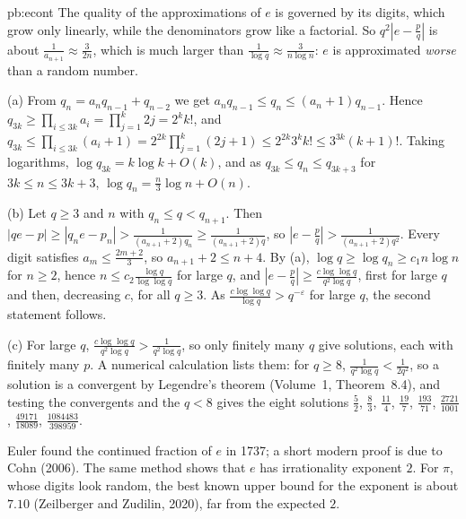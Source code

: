 \begin{solution}{pb:econt}
\idea The quality of the approximations of $e$ is governed by its digits, which grow only linearly, while the denominators grow like a factorial. So
$q^2|e-\frac pq|$ is about $\frac1{a_{n+1}}\approx\frac3{2n}$, which is much larger than $\frac1{\log q}\approx\frac3{n\log n}$: $e$ is approximated \emph{worse}
than a random number.

\writeup (a) From $q_n=a_nq_{n-1}+q_{n-2}$ we get $a_nq_{n-1}\le q_n\le(a_n+1)q_{n-1}$. Hence $q_{3k}\ge\prod_{i\le3k}a_i=\prod_{j=1}^k2j=2^kk!$, and
$q_{3k}\le\prod_{i\le3k}(a_i+1)=2^{2k}\prod_{j=1}^k(2j+1)\le2^{2k}3^kk!\le3^{3k}(k+1)!$. Taking logarithms, $\log q_{3k}=k\log k+O(k)$, and as
$q_{3k}\le q_n\le q_{3k+3}$ for $3k\le n\le3k+3$, $\log q_n=\frac n3\log n+O(n)$.

(b) Let $q\ge3$ and $n$ with $q_n\le q<q_{n+1}$. Then $|qe-p|\ge|q_ne-p_n|>\frac1{(a_{n+1}+2)q_n}\ge\frac1{(a_{n+1}+2)q}$, so
$|e-\frac pq|>\frac1{(a_{n+1}+2)q^2}$. Every digit satisfies $a_m\le\frac{2m+2}3$, so $a_{n+1}+2\le n+4$. By (a), $\log q\ge\log q_n\ge c_1n\log n$ for $n\ge2$, hence
$n\le c_2\frac{\log q}{\log\log q}$ for large $q$, and $|e-\frac pq|\ge\frac{c\log\log q}{q^2\log q}$, first for large $q$ and then, decreasing $c$, for all $q\ge3$. As
$\frac{c\log\log q}{\log q}>q^{-\varepsilon}$ for large $q$, the second statement follows.

(c) For large $q$, $\frac{c\log\log q}{q^2\log q}>\frac1{q^2\log q}$, so only finitely many $q$ give solutions, each with finitely many $p$. A numerical calculation lists them: for
$q\ge8$, $\frac1{q^2\log q}<\frac1{2q^2}$, so a solution is a convergent by Legendre's theorem (Volume~1, Theorem~8.4), and testing the convergents and the
$q<8$ gives the eight solutions $\frac52$, $\frac83$, $\frac{11}4$, $\frac{19}7$, $\frac{193}{71}$, $\frac{2721}{1001}$, $\frac{49171}{18089}$, $\frac{1084483}{398959}$.

\leads Euler found the continued fraction of $e$ in 1737; a short modern proof is due to Cohn (2006). The same method shows that $e$ has irrationality
exponent $2$. For $\pi$, whose digits look random, the best known upper bound for the exponent is about $7.10$ (Zeilberger and Zudilin, 2020), far from the
expected $2$.
\end{solution}


